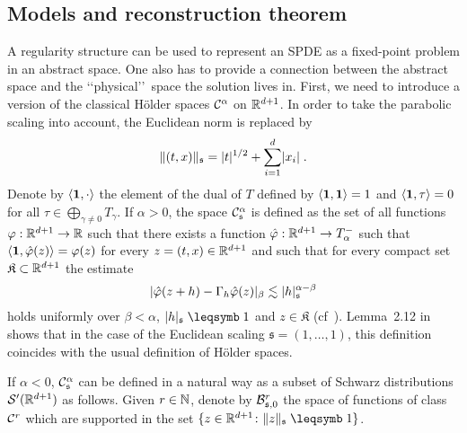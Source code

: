 \documentclass[reqno,11pt]{article}
\def\unit{\vone}
\def\fraks{\mathfrak{s}}
\def\fraK{\mathfrak{K}}
\def\abss#1{\abs{#1}_\mathfrak{s}}
\begin{document}

\subsection{Models and reconstruction theorem}
\label{ssec_model}

A regularity structure can be used to represent an SPDE as a fixed-point problem
in an abstract space. One also has to provide a connection between the abstract
space and the \lq\lq physical\rq\rq\ space the solution lives in. 
First, we need to introduce a version of the classical H\"older spaces
${\mathcal C}^\alpha$ on $\mathbb{R}^{d+1}$. In order to take the parabolic scaling into account,
the Euclidean norm is replaced by 
\begin{equation}
\label{eq:parabolic_norm} 
\norm{(t,x)}_{\fraks} = \abs{t}^{1/2} + \sum_{i=1}^d \abs{x_i}\;.
\end{equation}
Denote by $\pscal{\unit}{\cdot}$ the element of the dual of $T$ defined by
$\pscal{\unit}{\unit} = 1$ and $\pscal{\unit}{\tau} = 0$ for all $\tau\in
\bigoplus_{\gamma\neq0}T_\gamma$. If $\alpha>0$, the space $\cC^\alpha_\fraks$
is defined as the set of all
functions $\varphi:\mathbb{R}^{d+1} \rightarrow \mathbb{R}$ such that there exists a function
$\hat{\varphi}: \mathbb{R}^{d+1}\rightarrow T_\alpha^-$ such that $\pscal{\unit}
{\hat{\varphi}(z)}=\varphi(z)$ for every $z=(t,x)\in\mathbb{R}^{d+1}$ and such that for
every compact set $\fraK\subset \R^{d+1}$ the estimate
\begin{equation}
\abs{\hat{\varphi}(z+h)-\Gamma_h\hat{\varphi}(z)}_\beta \lesssim
\abss{h}^{\alpha-\beta}
\end{equation}  
holds uniformly over $\beta<\alpha$, $\abss{h}\leqs 1$ and $z\in \fraK$
(cf~\cite[Def.~2.14]{Hairer2014}). Lemma~2.12 in~\cite{Hairer2014} shows
that in the case of the Euclidean scaling $\fraks=(1,\dots,1)$, this
definition coincides with the usual definition of H\"older spaces.

If $\alpha<0$, $\cC^\alpha_\fraks$ can be defined in a natural way as a subset
of Schwarz distributions ${\mathcal S}'(\mathbb{R}^{d+1})$ as follows. Given
$r\in\mathbb{N}$, denote by $\cB^r_{\fraks,0}$ the space of functions of
class ${\mathcal C}^r$ which are supported in the set
$\setsuch{z\in\R^{d+1}}{\norm{z}_{\fraks}\leqs1}$.
\end{document}
